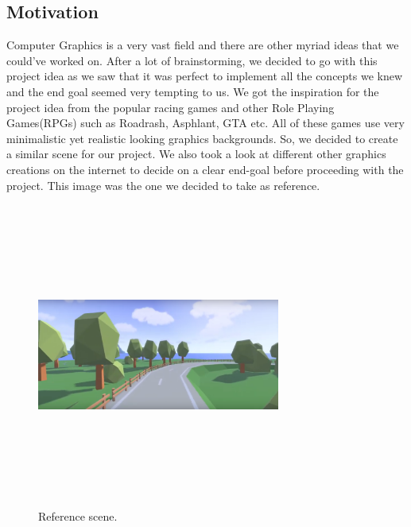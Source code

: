 \documentclass{report}
\begin{document}
\subsection{Motivation}
    Computer Graphics is a very vast field and there are other myriad ideas that we could've worked on. 
    After a lot of brainstorming, we decided to go with this project idea as we saw that it was perfect to 
    implement all the concepts we knew and the end goal seemed very tempting to us. We got the inspiration for 
    the project idea from the popular racing games and other Role Playing Games(RPGs) such as Roadrash, Asphlant, 
    GTA etc. All of these games use very minimalistic yet realistic looking graphics backgrounds. So, we decided 
    to create a similar scene for our project. We also took a look at different other graphics creations on the 
    internet to decide on a clear end-goal before proceeding with the project. This image was the one we 
    decided to take as reference.
    \medskip
    \begin{figure}[h!]
      \centering
        \includegraphics[width=8cm,height=10cm,keepaspectratio]{motivation.png}
        \caption{Reference scene.}
    \end{figure}
\end{document}
